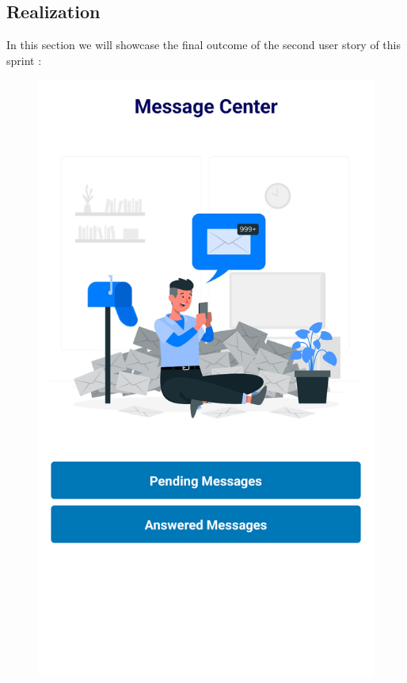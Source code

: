 \subsection{Realization}
In this section we will showcase the final outcome of the second user story of this sprint :
\begin{figure}[H]
\begin{minipage}{0.35\textwidth}
    \centering
    \includegraphics[width=\linewidth]{images/sprint4/feedBackModule (7).png}

\end{minipage}
\end{figure}
